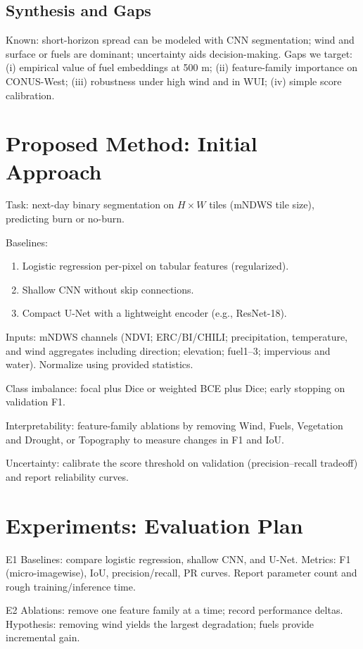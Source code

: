 \documentclass[conference]{IEEEtran}
\begin{document}
\subsection{Synthesis and Gaps}
Known: short-horizon spread can be modeled with CNN segmentation; wind and surface or fuels are dominant; uncertainty aids decision-making. Gaps we target: (i) empirical value of fuel embeddings at 500 m; (ii) feature-family importance on CONUS-West; (iii) robustness under high wind and in WUI; (iv) simple score calibration.

\section{Proposed Method: Initial Approach}
Task: next-day binary segmentation on $H\times W$ tiles (mNDWS tile size), predicting burn or no-burn.

Baselines:
\begin{enumerate}
    \item Logistic regression per-pixel on tabular features (regularized).
    \item Shallow CNN without skip connections.
    \item Compact U-Net with a lightweight encoder (e.g., ResNet-18).
\end{enumerate}

Inputs: mNDWS channels (NDVI; ERC/BI/CHILI; precipitation, temperature, and wind aggregates including direction; elevation; fuel1--3; impervious and water). Normalize using provided statistics.

Class imbalance: focal plus Dice or weighted BCE plus Dice; early stopping on validation F1.

Interpretability: feature-family ablations by removing Wind, Fuels, Vegetation and Drought, or Topography to measure changes in F1 and IoU.

Uncertainty: calibrate the score threshold on validation (precision–recall tradeoff) and report reliability curves.

\section{Experiments: Evaluation Plan}
E1 Baselines: compare logistic regression, shallow CNN, and U-Net. Metrics: F1 (micro-imagewise), IoU, precision/recall, PR curves. Report parameter count and rough training/inference time.

E2 Ablations: remove one feature family at a time; record performance deltas. Hypothesis: removing wind yields the largest degradation; fuels provide incremental gain.
\end{document}
